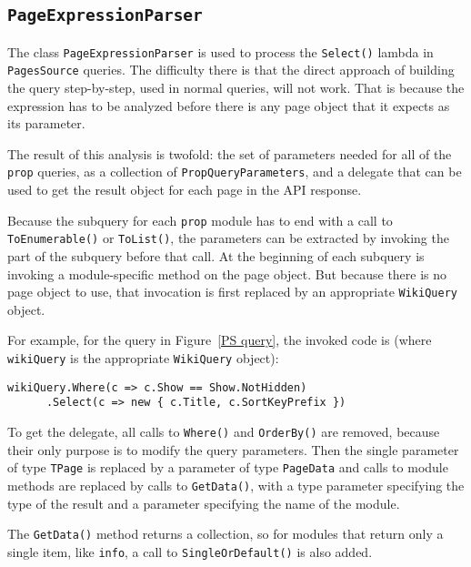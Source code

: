 \subsection{\texorpdfstring{\lstinline{PageExpressionParser}}{PageExpressionParser}}
\label{PageExpressionParser}

The class \lstinline{PageExpressionParser} is used to process
the \lstinline{Select()} lambda in \lstinline{PagesSource} queries.
The difficulty there is that the direct approach of building the query step-by-step,
used in normal queries, will not work.
That is because the expression has to be analyzed before there is any page object
that it expects as its parameter.

The result of this analysis is twofold:
the set of parameters needed for all of the \lstinline{prop} queries,
as a collection of \lstinline{PropQueryParameters},
and a delegate that can be used to get the result object for each page in the \ac{API} response.

\medskip

Because the subquery for each \texttt{prop} module has to end with a call to \lstinline{To}\lstBreak\lstinline{Enumerable()} or \lstinline{ToList()},
the parameters can be extracted by invoking the part of the subquery before that call.
At the beginning of each subquery is invoking a module-specific method on the page object.
But because there is no page object to use, that invocation is first replaced by an appropriate \lstinline{WikiQuery} object.

For example, for the query in Figure~\ref{PS query}, the invoked code is (where \lstinline{wikiQuery} is the appropriate \lstinline{WikiQuery} object):

\begin{lstlisting}
wikiQuery.Where(c => c.Show == Show.NotHidden)
	  .Select(c => new { c.Title, c.SortKeyPrefix })
\end{lstlisting}

\medskip

To get the delegate, all calls to \lstinline{Where()} and \lstinline{OrderBy()} are removed,
because their only purpose is to modify the query parameters.
Then the single parameter of type \lstinline{TPage} is replaced by a parameter of type \lstinline{PageData}
and calls to module methods are replaced by calls to \lstinline{GetData()},
with a type parameter specifying the type of the result and a parameter specifying the name of the module.

The \lstinline{GetData()} method returns a collection,
so for modules that return only a single item, like \texttt{info},
a call to \lstinline{Single}\lstBreak\lstinline{Or}\lstBreak\lstinline{Default()} is also added.

